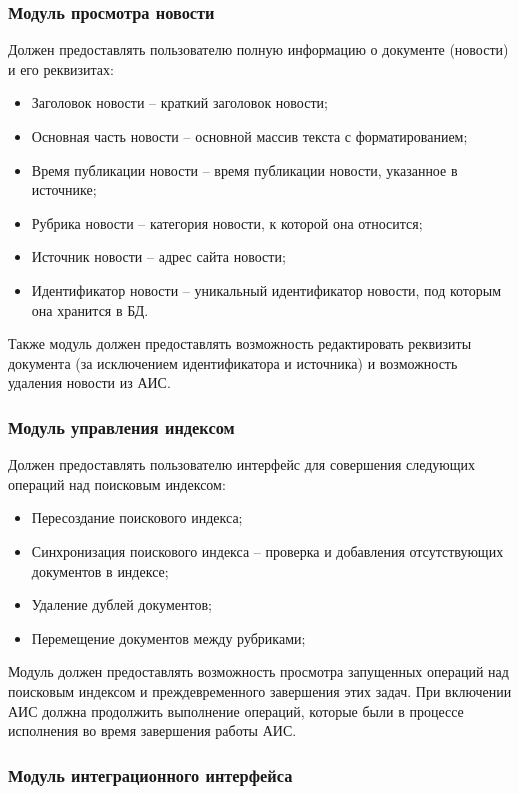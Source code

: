 \documentclass[russian,utf8,emptystyle]{eskdtext}
\begin{document}
\subsubsection{Модуль просмотра новости}

Должен предоставлять пользователю полную информацию о документе (новости) и его реквизитах:
\begin{itemize}
\item Заголовок новости -- краткий заголовок новости;
\item Основная часть новости -- основной массив текста с форматированием;
\item Время публикации новости -- время публикации новости, указанное в источнике;
\item Рубрика новости -- категория новости, к которой она относится;
\item Источник новости -- адрес сайта новости;
\item Идентификатор новости -- уникальный идентификатор новости, под которым она хранится в БД.
\end{itemize}

Также модуль должен предоставлять возможность редактировать реквизиты документа (за исключением идентификатора и источника) и возможность удаления новости из АИС.


\subsubsection{Модуль управления индексом}

Должен предоставлять пользователю интерфейс для совершения следующих операций над поисковым индексом:
\begin{itemize}
\item Пересоздание поискового индекса;
\item Синхронизация поискового индекса -- проверка и добавления отсутствующих документов в индексе;
\item Удаление дублей документов;
\item Перемещение документов между рубриками;
\end{itemize}

Модуль должен предоставлять возможность просмотра запущенных операций над поисковым индексом и преждевременного завершения этих задач. При включении АИС должна продолжить выполнение операций, которые были в процессе исполнения во время завершения работы АИС.

\subsubsection{Модуль интеграционного интерфейса}
\end{document}
